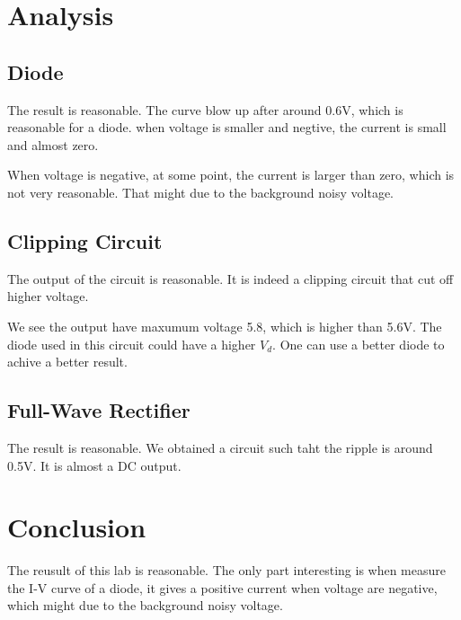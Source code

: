 \documentclass[aps,prl,reprint]{revtex4-1}
\begin{document}
\section{Analysis}
    \subsection{Diode}
    The result is reasonable. The curve blow up after around 0.6V, which is reasonable for a diode. when voltage is smaller and negtive, the current is small and almost zero. 

    When voltage is negative, at some point, the current is larger than zero, which is not very reasonable. That might due to the background noisy voltage.
    \subsection{Clipping Circuit}
    The output of the circuit is reasonable. It is indeed a clipping circuit that cut off higher voltage. 

    We see the output have maxumum voltage 5.8, which is higher than 5.6V. The diode used in this circuit could have a higher $V_d$. One can use a better diode to achive a better result.
    \subsection{Full-Wave Rectifier}
    The result is reasonable. We obtained a circuit such taht the ripple is around 0.5V. It is almost a DC output.
    
\section{Conclusion}
    The reusult of this lab is reasonable. The only part interesting is when measure the I-V curve of a diode, it gives a positive current when voltage are negative, which might due to the background noisy voltage.




\end{document}

